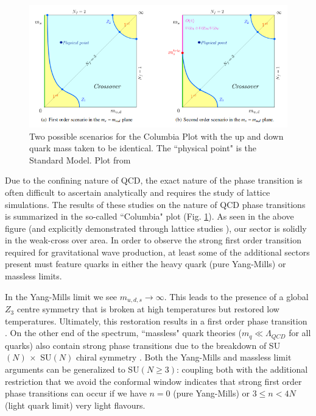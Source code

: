 \documentclass[nofootinbib,twocolumn,preprintnumbers]{revtex4-2}
\begin{document}
\begin{figure}[tb]
\centering
\begin{minipage}[c]{\textwidth}
\includegraphics[width=1.0\textwidth]{columbia.png}
\end{minipage}
\hfill
\caption{Two possible scenarios for the Columbia Plot with the up and down quark mass taken to be identical. The ``physical point" is the Standard Model. Plot from \cite{Cuteri:2017zcb}
}
\label{fig:columbia}
\end{figure}

Due to the confining nature of QCD, the exact nature of the phase transition is often difficult to ascertain analytically and requires the study of lattice simulations. The results of these studies on the nature of QCD phase transitions is summarized in the so-called ``Columbia" plot (Fig. \ref{fig:columbia}). As seen in the above figure (and explicitly demonstrated through lattice studies \cite{lattice}), our sector is solidly in the weak-cross over area. In order to observe the strong first order transition required for gravitational wave production, at least some of the additional sectors present must feature quarks in either the heavy quark (pure Yang-Mills) or massless limits.    

In the Yang-Mills limit we see $m_{u,d,s} \rightarrow \infty$. This leads to the presence of a global $Z_3$ centre symmetry that is broken at high temperatures but restored low temperatures. Ultimately, this restoration results in a first order phase transition \cite{SVETITSKY1982423}. On the other end of the spectrum, ``massless" quark theories ($m_q \ll \Lambda_{QCD}$ for all quarks) also contain strong phase transitions due to the breakdown of SU$(N)\,\times$ SU$(N)$ chiral symmetry \cite{Pisarski:1983ms}. Both the Yang-Mills and massless limit arguments can be generalized to SU$(N \geq 3)$: coupling both with the additional restriction that we avoid the conformal window indicates that strong first order phase transitions can occur if we have $n = 0$ (pure Yang-Mills) or $3 \leq n < 4N$ (light quark limit) very light flavours.
\end{document}
